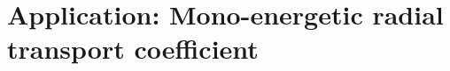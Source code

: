\documentclass{beamer}
\newcommand{\be}[1]{\begin{equation} \label{#1}}
\newcommand{\ee}{\end{equation}}
\begin{document}
\section{Application: Mono-energetic radial transport coefficient}


\end{document}
